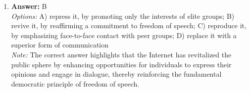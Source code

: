 \documentclass[12pt]{article}
\begin{document}
\begin{enumerate}[label=\arabic*.]
\\ \textit{Note:} The tripartite system utilized the 11+ exam as a means to classify students into three distinct types of secondary schools-grammar, technical, and secondary modern-based on their academic abilities and potential, reflecting a stratified educational structure aimed at optimizing educational outcomes according to perceived aptitude.
\item \textbf{Answer:} B
\\ \textit{Options:} A) repress it, by promoting only the interests of elite groups; B) revive it, by reaffirming a commitment to freedom of speech; C) reproduce it, by emphasizing face-to-face contact with peer groups; D) replace it with a superior form of communication
\\ \textit{Note:} The correct answer highlights that the Internet has revitalized the public sphere by enhancing opportunities for individuals to express their opinions and engage in dialogue, thereby reinforcing the fundamental democratic principle of freedom of speech.
\end{enumerate}
\end{document}
